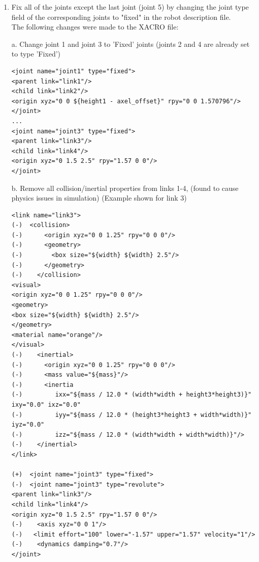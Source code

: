 \documentclass[10pt]{article}
\begin{document}
\begin{enumerate}
\item Fix all of the joints except the last joint (joint 5) by changing the joint type field of the corresponding joints to "fixed" in the robot description file.
\\

The following changes were made to the XACRO file:

a. Change joint 1 and joint 3 to 'Fixed' joints (joints 2 and 4 are already set to type 'Fixed')
\begin{lstlisting}[style=Matlab-editor,basicstyle=\mlttfamily,escapechar=`]
<joint name="joint1" type="fixed">
<parent link="link1"/>
<child link="link2"/>
<origin xyz="0 0 ${height1 - axel_offset}" rpy="0 0 1.570796"/>
</joint>
...
<joint name="joint3" type="fixed">
<parent link="link3"/>
<child link="link4"/>
<origin xyz="0 1.5 2.5" rpy="1.57 0 0"/>
</joint>

\end{lstlisting} 

b. Remove all collision/inertial properties from links 1-4, (found to cause physics issues in simulation) (Example shown for link 3)
\begin{lstlisting}[style=Matlab-editor,basicstyle=\mlttfamily,escapechar=`]
<link name="link3">
(-)  <collision>
(-)      <origin xyz="0 0 1.25" rpy="0 0 0"/>
(-)      <geometry>
(-)        <box size="${width} ${width} 2.5"/>
(-)      </geometry>
(-)    </collision>
<visual>
<origin xyz="0 0 1.25" rpy="0 0 0"/>
<geometry>
<box size="${width} ${width} 2.5"/>
</geometry>
<material name="orange"/>
</visual>
(-)    <inertial>
(-)      <origin xyz="0 0 1.25" rpy="0 0 0"/>
(-)      <mass value="${mass}"/>
(-)      <inertia
(-)         ixx="${mass / 12.0 * (width*width + height3*height3)}" ixy="0.0" ixz="0.0"
(-)         iyy="${mass / 12.0 * (height3*height3 + width*width)}" iyz="0.0"
(-)         izz="${mass / 12.0 * (width*width + width*width)}"/>
(-)    </inertial>
</link>

(+)  <joint name="joint3" type="fixed">
(-)  <joint name="joint3" type="revolute">
<parent link="link3"/>
<child link="link4"/>
<origin xyz="0 1.5 2.5" rpy="1.57 0 0"/>
(-)    <axis xyz="0 0 1"/>
(-)   <limit effort="100" lower="-1.57" upper="1.57" velocity="1"/>
(-)    <dynamics damping="0.7"/>
</joint>
\end{lstlisting} 


\end{enumerate}
\end{document}

